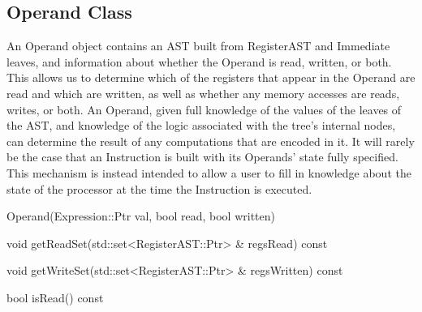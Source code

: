 \subsection{Operand Class}
\label{sec:operand}

An Operand object contains an AST built from RegisterAST and Immediate leaves,
and information about whether the Operand is read, written, or both. This allows
us to determine which of the registers that appear in the Operand are read and
which are written, as well as whether any memory accesses are reads, writes, or
both. An Operand, given full knowledge of the values of the leaves of the AST,
and knowledge of the logic associated with the tree's internal nodes, can
determine the result of any computations that are encoded in it. It will rarely
be the case that an Instruction is built with its Operands' state fully
specified. This mechanism is instead intended to allow a user to fill in
knowledge about the state of the processor at the time the Instruction is
executed. 

\begin{apient}
Operand(Expression::Ptr val, bool read, bool written)
\end{apient}

\begin{apient}
void getReadSet(std::set<RegisterAST::Ptr> & regsRead) const
\end{apient}

\begin{apient}
void getWriteSet(std::set<RegisterAST::Ptr> & regsWritten) const
\end{apient}

\begin{apient}

bool isRead() const
\end{apient}

